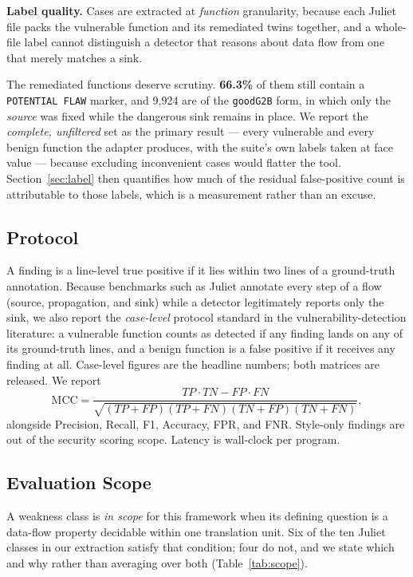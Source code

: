 \documentclass[10pt,conference]{IEEEtran}
\begin{document}
\textbf{Label quality.} Cases are extracted at \emph{function} granularity,
because each Juliet file packs the vulnerable function and its remediated
twins together, and a whole-file label cannot distinguish a detector that
reasons about data flow from one that merely matches a sink.

The remediated functions deserve scrutiny. \textbf{66.3\%} of them still
contain a \texttt{POTENTIAL FLAW} marker, and 9{,}924 are of the
\texttt{goodG2B} form, in which only the \emph{source} was fixed while the
dangerous sink remains in place. We report the \emph{complete, unfiltered}
set as the primary result --- every vulnerable and every benign function the
adapter produces, with the suite's own labels taken at face value --- because
excluding inconvenient cases would flatter the tool. Section~\ref{sec:label}
then quantifies how much of the residual false-positive count is attributable
to those labels, which is a measurement rather than an excuse.

\subsection{Protocol}
A finding is a line-level true positive if it lies within two lines of a
ground-truth annotation. Because benchmarks such as Juliet annotate every
step of a flow (source, propagation, and sink) while a detector legitimately
reports only the sink, we also report the \emph{case-level} protocol standard
in the vulnerability-detection literature: a vulnerable function counts as
detected if any finding lands on any of its ground-truth lines, and a benign
function is a false positive if it receives any finding at all. Case-level
figures are the headline numbers; both matrices are released. We report
\begin{equation}
\mathrm{MCC}=\frac{TP\cdot TN-FP\cdot FN}
{\sqrt{(TP{+}FP)(TP{+}FN)(TN{+}FP)(TN{+}FN)}},
\end{equation}
alongside Precision, Recall, F1, Accuracy, FPR, and FNR. Style-only findings
are out of the security scoring scope. Latency is wall-clock per program.

\subsection{Evaluation Scope}
\label{sec:scope}
A weakness class is \emph{in scope} for this framework when its defining
question is a data-flow property decidable within one translation unit. Six
of the ten Juliet classes in our extraction satisfy that condition; four do
not, and we state which and why rather than averaging over both
(Table~\ref{tab:scope}).
\end{document}
